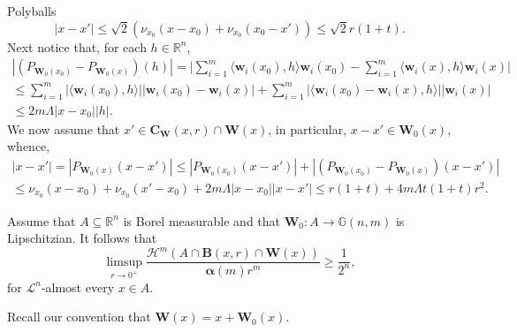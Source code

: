 \documentclass[JEP,XML,SOM,Unicode,ThmDefs,NoEqCountersInSection]{cedram}
\newenvironment{Empty}[2][\null]{%
\begin{enonce}[remark]{#1}#2}
{\end{enonce}}
\newcommand{\R}{\mathbb{R}}
\newcommand{\Rn}{\R^n}
\newcommand{\calH}{\mathscr{H}}
\newcommand{\calL}{\mathscr{L}}
\newcommand{\balpha}{\boldsymbol{\alpha}}
\newcommand{\bB}{{\boldsymbol{B}}}
\newcommand{\bC}{{\boldsymbol{C}}}
\newcommand{\bW}{{\boldsymbol{W}}}
\newcommand{\bw}{{\boldsymbol{w}}}
\newcommand{\bG}{\mathbb{G}}
\let\la\langle
\let\ra\rangle
\let\subset\subseteq
\begin{document}
\begin{Empty}[Polyballs]
\[
|x-x'| \leq \sqrt{2} \left(\nu_{x_0}(x-x_0) + \nu_{x_0}(x_0-x') \right) \leq \sqrt{2} r (1+t).
\]
Next notice that, for each $h \in \Rn$,
\begin{multline*}
\left| \left(P_{\bW_0(x_0)} - P_{\bW_0(x)} \right) (h) \right| = \biggl| \sum_{i=1}^m \la \bw_i(x_0), h \ra \bw_i(x_0) - \sum_{i=1}^m \la \bw_i(x), h \ra \bw_i(x)\biggr| \\
\leq \sum_{i=1}^m \left| \la \bw_i(x_0),h \ra \right| \left| \bw_i(x_0) - \bw_i(x) \right| + \sum_{i=1}^m \left| \la \bw_i(x_0) - \bw_i(x), h \ra \right| \left| \bw_i(x) \right| \\
\leq 2 m \Lambda \left| x-x_0 \right| |h|.
\end{multline*}
We now assume that $x' \in \bC_\bW(x,r) \cap \bW(x)$, in particular, $x-x' \in \bW_0(x)$, whence,
\begin{multline*}
\left| x-x' \right| = \left| P_{\bW_0(x)}(x-x')\right| \leq \left| P_{\bW_0(x_0)}(x-x')\right| + \left| \left(P_{\bW_0(x_0)} - P_{\bW_0(x)}\right)(x-x')\right| \\
\leq \nu_{x_0}(x-x_0) + \nu_{x_0}(x'-x_0) + 2 m \Lambda |x-x_0| |x-x'| \leq r(1+t) + 4m \Lambda t(1+t) r^2.
\end{multline*}
\end{Empty}

\begin{theorem}
\label{main.density}
Assume that $A \subset \Rn$ is Borel measurable and that $\bW_0: A \to \bG(n,m)$ is Lipschitzian.
It follows that
\begin{equation*}
\limsup_{r \to 0^+} \frac{\calH^m\left(A \cap \bB(x,r) \cap \bW(x)\right)}{\balpha(m)r^m} \geq \frac{1}{2^n},
\end{equation*}
for $\calL^n$-almost every $x \in A$.
\end{theorem}

Recall our convention that $\bW(x) = x + \bW_0(x)$.
\end{document}
